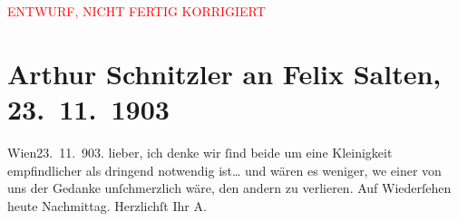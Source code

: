 
\begin{center}
            \textcolor{red}{ENTWURF, NICHT FERTIG KORRIGIERT}
                      \end{center}
            
         
         \renewcommand{\erwaehntePersonen}{Personen: Felix Salten}
         \renewcommand{\erwaehnteOrte}{Orte: Wien}
         \renewcommand{\erwaehnteWerke}{}
               \section[Arthur Schnitzler an Felix Salten, 23. 11. 1903]{ Arthur Schnitzler an Felix Salten, 23. 11. 1903}\nopagebreak{}\rehead{ }\begin{ledgroupsized}[t]{13cm}\normalsize\beginnumbering \toendnotes[C]{\smallbreak\pagebreak[2]} 
\pstart
           \raggedleft{}{\pb}Wien23. 11. 903. \pend
           \pstart
           lieber, ich denke wir ſind beide um eine Kleinigkeit empfindlicher
               als dringend notwendig ist{\dots} und wären es weniger, we{\geminationn} einer von uns der Gedanke unſchmerzlich wäre, den
               andern zu verlieren. Auf Wiederſehen heute Nachmittag. Herzlichſt Ihr\pend
           \pstart \spacefill\mbox{A.}\pend{}
         
         \endnumbering{}\end{ledgroupsized}\begin{anhang}\end{anhang}\newcommand{\dateiname}{L02990}\newcommand{\titel}{Arthur Schnitzler an Felix Salten, 23. 11. 1903}\newcommand{\editorInnen}{Martin Anton Müller und Laura Untner}
      